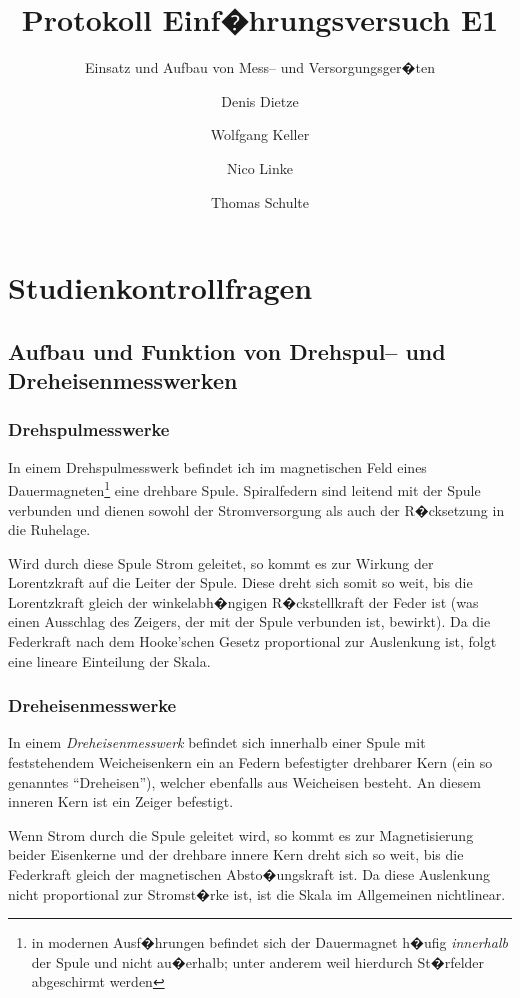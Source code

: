 \documentclass[10pt]{scrartcl}
\author{Denis Dietze \and Wolfgang Keller \and Nico Linke \and Thomas Schulte}
\title{Protokoll Einf�hrungsversuch E1}
\subtitle{Einsatz und Aufbau von Mess-- und Versorgungsger�ten}
\begin{document}
\maketitle

\section{Studienkontrollfragen}

\subsection{Aufbau und Funktion von Drehspul-- und Dreheisenmesswerken}

\subsubsection{Drehspulmesswerke}

In einem Drehspulmesswerk befindet ich im magnetischen Feld eines Dauermagneten\footnote{in modernen Ausf�hrungen befindet sich der Dauermagnet h�ufig \emph{innerhalb} der Spule und nicht au�erhalb; unter anderem weil hierdurch St�rfelder abgeschirmt werden} eine drehbare Spule. Spiralfedern sind leitend mit der Spule verbunden und dienen sowohl der Stromversorgung als auch der R�cksetzung in die Ruhelage.

Wird durch diese Spule Strom geleitet, so kommt es zur Wirkung der Lorentzkraft auf die Leiter der Spule. Diese dreht sich somit so weit, bis die Lorentzkraft gleich der winkelabh�ngigen R�ckstellkraft der Feder ist (was einen Ausschlag des Zeigers, der mit der Spule verbunden ist, bewirkt). Da die Federkraft nach dem Hooke'schen Gesetz proportional zur Auslenkung ist, folgt eine lineare Einteilung der Skala.

\subsubsection{Dreheisenmesswerke}

In einem \emph{Dreheisenmesswerk} befindet sich innerhalb einer Spule mit feststehendem Weicheisenkern ein an Federn befestigter drehbarer Kern (ein so genanntes "`Dreheisen"'), welcher ebenfalls aus Weicheisen besteht. An diesem inneren Kern ist ein Zeiger befestigt.

Wenn Strom durch die Spule geleitet wird, so kommt es zur Magnetisierung beider Eisenkerne und der drehbare innere Kern dreht sich so weit, bis die Federkraft gleich der magnetischen Absto�ungskraft ist. Da diese Auslenkung nicht proportional zur Stromst�rke ist, ist die Skala im Allgemeinen nichtlinear.
\end{document}
